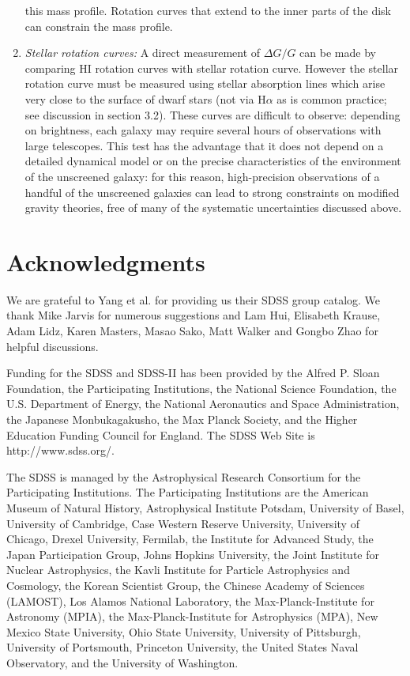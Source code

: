 \documentclass[useAMS,usenatbib,twocolumn]{mn2e}
\newcommand{\ha}{H$\alpha$}
\begin{document}
\begin{enumerate}
  this mass profile. Rotation curves that extend to the inner parts of the disk
can
  constrain the mass profile. 
\item {\it Stellar rotation curves: }
  A direct measurement of $\Delta G/G$ can be made by
  comparing HI rotation curves with stellar rotation curve. However 
  the stellar rotation curve must be measured using stellar absorption
  lines which arise very close to the surface of dwarf stars (not via 
  \ha{} as is common practice; see discussion in section 3.2).  These curves
  are difficult to observe: depending on brightness, each galaxy may require
  several hours of observations with large telescopes. This test
  has the advantage that it does not depend on a detailed dynamical model
  or on the precise characteristics of the environment of the unscreened
  galaxy: for this reason, high-precision observations of
  a handful of the unscreened galaxies can lead to strong constraints on
  modified gravity theories, free of many of the systematic uncertainties
  discussed above.
\end{enumerate}


\section{Acknowledgments}
We are grateful to Yang et al. for providing us their SDSS group catalog.  
We thank Mike Jarvis for numerous suggestions and Lam Hui, 
Elisabeth Krause, Adam Lidz, Karen Masters, Masao Sako, 
Matt Walker and Gongbo Zhao for helpful
discussions. 

Funding for the SDSS and SDSS-II has been provided by the Alfred P. Sloan
Foundation, the Participating Institutions, the National Science Foundation,
the U.S. Department of Energy, the National Aeronautics and Space
Administration, the Japanese Monbukagakusho, the Max Planck Society, and the
Higher Education Funding Council for England. The SDSS Web Site is
http://www.sdss.org/.

The SDSS is managed by the Astrophysical Research Consortium for the
Participating Institutions. The Participating Institutions are the American
Museum of Natural History, Astrophysical Institute Potsdam, University of
Basel, University of Cambridge, Case Western Reserve University, University of
Chicago, Drexel University, Fermilab, the Institute for Advanced Study, the
Japan Participation Group, Johns Hopkins University, the Joint Institute for
Nuclear Astrophysics, the Kavli Institute for Particle Astrophysics and
Cosmology, the Korean Scientist Group, the Chinese Academy of Sciences
(LAMOST), Los Alamos National Laboratory, the Max-Planck-Institute for
Astronomy (MPIA), the Max-Planck-Institute for Astrophysics (MPA), New Mexico
State University, Ohio State University, University of Pittsburgh,
University of Portsmouth, Princeton University, the United States Naval
Observatory, and the University of Washington.
\end{document}
